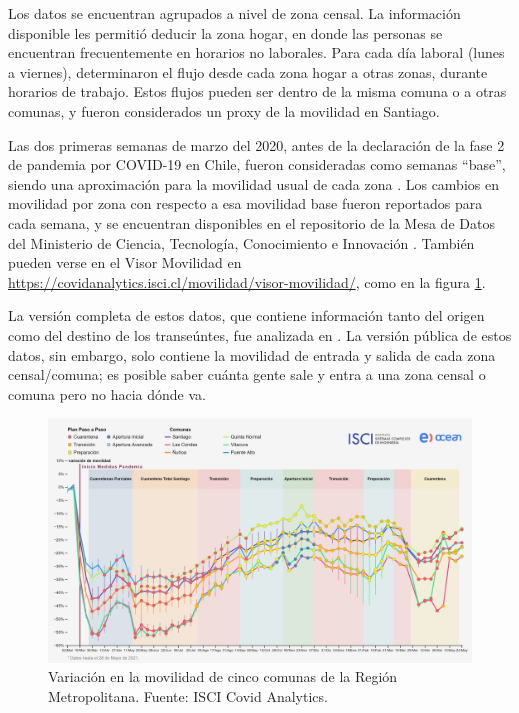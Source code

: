 Los datos se encuentran agrupados a nivel de zona censal. La información disponible les permitió deducir la zona hogar, en donde las personas se encuentran frecuentemente en horarios no laborales. Para cada día laboral (lunes a viernes), determinaron el flujo desde cada zona hogar a otras zonas, durante horarios de trabajo. Estos flujos pueden ser dentro de la misma comuna o a otras comunas, y fueron considerados un proxy de la movilidad en Santiago. %

Las dos primeras semanas de marzo del 2020, antes de la declaración de la fase 2 de pandemia por COVID-19 en Chile, fueron consideradas como semanas ``base'', siendo una aproximación para la movilidad usual de cada zona \cite{Olivares2020}. Los cambios en movilidad por zona con respecto a esa movilidad base fueron reportados para cada semana, y se encuentran disponibles en el repositorio de la Mesa de Datos del Ministerio de Ciencia, Tecnología, Conocimiento e Innovación \cite{MINCIENCIA}. También pueden verse en el Visor Movilidad en \url{https://covidanalytics.isci.cl/movilidad/visor-movilidad/}, como en la figura \ref{img:ISCI-movilidad-RM}.

La versión completa de estos datos, que contiene información tanto del origen como del destino de los transeúntes, fue analizada en \cite{Carranza2020}. La versión pública de estos datos, sin embargo, solo contiene la movilidad de entrada y salida de cada zona censal/comuna; es posible saber cuánta gente sale y entra a una zona censal o comuna pero no hacia dónde va.

\begin{figure}[H]
\centering
\includegraphics[width=\textwidth]{img/metodologia/datos/ISCI-movilidad-RM.png}
\caption{Variación en la movilidad de cinco comunas de la Región Metropolitana. Fuente: ISCI Covid Analytics.}
\label{img:ISCI-movilidad-RM}
\end{figure}




